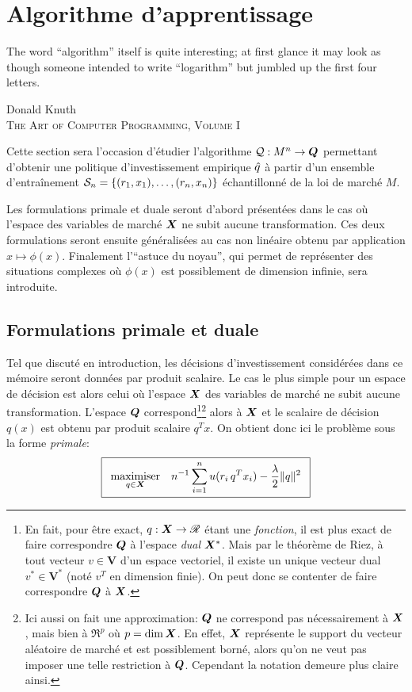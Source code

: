 \section{Algorithme d'apprentissage}
\label{sec:kernel}

\epigraph{The word “algorithm” itself is quite interesting; at first glance it may look as
  though someone intended to write “logarithm” but jumbled up the first four
  letters.}{Donald Knuth\\\textsc{The Art of Computer Programming, Volume I}}


Cette section sera l'occasion d'étudier l'algorithme $\alg:M^n \to \Q$ permettant d'obtenir
une politique d'investissement empirique $\qh$ à partir d'un ensemble d'entraînement
$\S_n = \{(r_1,x_1),\ldots,(r_n,x_n)\}$ échantillonné de la loi de marché $M$.

Les formulations primale et duale seront d'abord présentées dans le cas où l'espace des
variables de marché $\X$ ne subit aucune transformation. Ces deux formulations seront
ensuite généralisées au cas non linéaire obtenu par application $x \mapsto \phi(x)$. Finalement
l'``astuce du noyau'', qui permet de représenter des situations complexes où $\phi(x)$ est
possiblement de dimension infinie, sera introduite. 


\subsection{Formulations primale et duale}

Tel que discuté en introduction, les décisions d'investissement considérées dans ce
mémoire seront données par produit scalaire. Le cas le plus simple pour un espace de
décision est alors celui où l'espace $\X$ des variables de marché ne subit aucune
transformation. L'espace $\Q$ correspond\footnote{En fait, pour être exact,
  $q : \X \to \Re$ étant une \textit{fonction}, il est plus exact de faire correspondre
  $\Q$ à l'espace \textit{dual} $\X^*$. Mais par le théorème de Riez, à tout vecteur
  $v \in \bm V$ d'un espace vectoriel, il existe un unique vecteur dual $v^* \in \bm V^*$
  (noté $v^T$ en dimension finie). On peut donc se contenter de faire correspondre $\Q$ à
  $\X$.}\footnote{Ici aussi on fait une approximation: $\Q$ ne correspond pas
  nécessairement à $\X$, mais bien à $\Re^p$ où $p = \dim\X$. En effet, $\X$ représente le
  support du vecteur aléatoire de marché et est possiblement borné, alors qu'on ne veut
  pas imposer une telle restriction à $\Q$. Cependant la notation demeure plus claire
  ainsi. } alors à $\X$ et le scalaire de décision $q(x)$ est obtenu par produit scalaire
$q^Tx$. On obtient donc ici le problème sous la forme \textit{primale}: {\begin{equation}
    \boxed{ \maximizeEquation[q\in\X]{n^{-1}\sumi u(r_i\,q^Tx_i) - \frac{\lambda}{2}\|q\|^2}}
\end{equation}
\vspace{-\baselineskip}}

